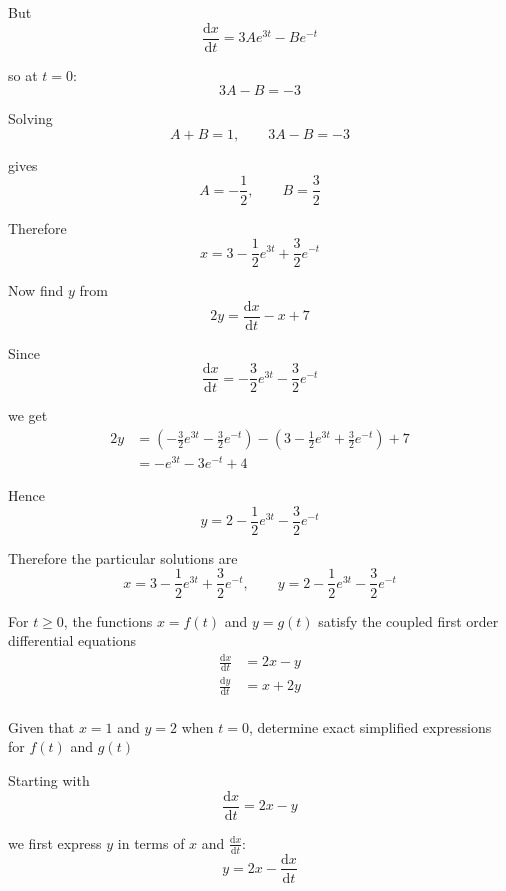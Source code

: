 \documentclass[leqno]{article}
\begin{document}
\begin{enumerate}[
  label=\textbf{\arabic*.},
  leftmargin=*,
  topsep=0pt,
  partopsep=0pt,
  parsep=0pt
]
\begin{djsSolution}
\begin{enumerate}[label=\textbf{(\alph*)}]
  But
  \[
  \frac{\mathrm{d}x}{\mathrm{d}t}=3Ae^{3t}-Be^{-t}
  \]

  so at $t=0$:
  \[
  3A-B=-3
  \]

  Solving
  \[
  A+B=1,\qquad 3A-B=-3
  \]

  gives
  \[
  A=-\frac12,\qquad B=\frac32
  \]

  Therefore
  \[
  x=3-\frac12e^{3t}+\frac32e^{-t}
  \]

  Now find $y$ from
  \[
  2y=\frac{\mathrm{d}x}{\mathrm{d}t}-x+7
  \]

  Since
  \[
  \frac{\mathrm{d}x}{\mathrm{d}t}
  =-\frac32e^{3t}-\frac32e^{-t}
  \]

  we get
  \begin{align*}
  2y
  &=\left(-\frac32e^{3t}-\frac32e^{-t}\right)
    -\left(3-\frac12e^{3t}+\frac32e^{-t}\right)+7\\
  &=-e^{3t}-3e^{-t}+4
  \end{align*}

  Hence
  \[
  y=2-\frac12e^{3t}-\frac32e^{-t}
  \]

  Therefore the particular solutions are
  \[
  x=3-\frac12e^{3t}+\frac32e^{-t},
  \qquad
  y=2-\frac12e^{3t}-\frac32e^{-t}
  \]

\end{enumerate}
\end{djsSolution}


\newpage

\questionitem

For $t\ge 0$, the functions $x=f(t)$ and $y=g(t)$ satisfy the coupled first order differential equations \\
\begin{align*}
\frac{\mathrm{d}x}{\mathrm{d}t}&=2x-y \\[5pt]
\frac{\mathrm{d}y}{\mathrm{d}t}&=x+2y
\end{align*} \\
Given that $x=1$ and $y=2$ when $t=0$, determine exact simplified expressions for $f(t)$ and $g(t)$  \\

\vspace*{10pt}

\begin{djsSolution}
Starting with
\[
\frac{\mathrm{d}x}{\mathrm{d}t}=2x-y
\]

we first express \(y\) in terms of \(x\) and \(\frac{\mathrm{d}x}{\mathrm{d}t}\):
\[
y=2x-\frac{\mathrm{d}x}{\mathrm{d}t}
\]


\end{djsSolution}
\end{enumerate}
\end{document}
